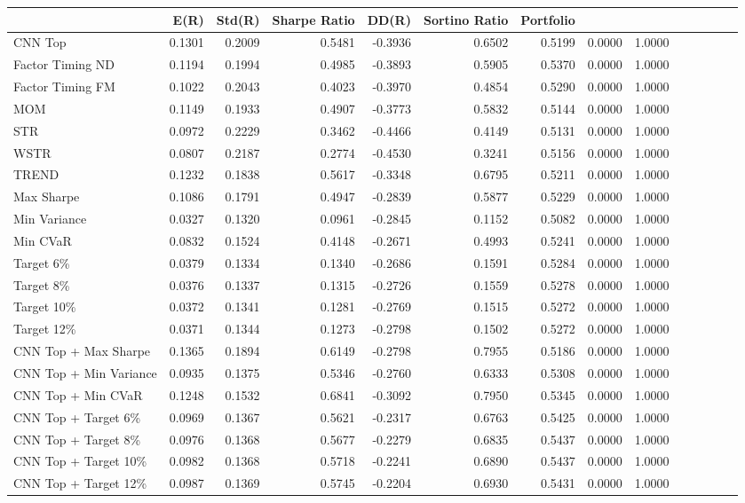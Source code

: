 \begin{tabular}{lrrrrrrrr}
\toprule
 & E(R) & Std(R) & Sharpe Ratio & DD(R) & Sortino Ratio & %
Portfolio &  &  &  &  &  &  &  &  \\
\midrule
CNN Top & 0.1301 & 0.2009 & 0.5481 & -0.3936 & 0.6502 & 0.5199 & 0.0000 & 1.0000 \\
Factor Timing ND & 0.1194 & 0.1994 & 0.4985 & -0.3893 & 0.5905 & 0.5370 & 0.0000 & 1.0000 \\
Factor Timing FM & 0.1022 & 0.2043 & 0.4023 & -0.3970 & 0.4854 & 0.5290 & 0.0000 & 1.0000 \\
MOM & 0.1149 & 0.1933 & 0.4907 & -0.3773 & 0.5832 & 0.5144 & 0.0000 & 1.0000 \\
STR & 0.0972 & 0.2229 & 0.3462 & -0.4466 & 0.4149 & 0.5131 & 0.0000 & 1.0000 \\
WSTR & 0.0807 & 0.2187 & 0.2774 & -0.4530 & 0.3241 & 0.5156 & 0.0000 & 1.0000 \\
TREND & 0.1232 & 0.1838 & 0.5617 & -0.3348 & 0.6795 & 0.5211 & 0.0000 & 1.0000 \\
Max Sharpe & 0.1086 & 0.1791 & 0.4947 & -0.2839 & 0.5877 & 0.5229 & 0.0000 & 1.0000 \\
Min Variance & 0.0327 & 0.1320 & 0.0961 & -0.2845 & 0.1152 & 0.5082 & 0.0000 & 1.0000 \\
Min CVaR & 0.0832 & 0.1524 & 0.4148 & -0.2671 & 0.4993 & 0.5241 & 0.0000 & 1.0000 \\
Target 6\% & 0.0379 & 0.1334 & 0.1340 & -0.2686 & 0.1591 & 0.5284 & 0.0000 & 1.0000 \\
Target 8\% & 0.0376 & 0.1337 & 0.1315 & -0.2726 & 0.1559 & 0.5278 & 0.0000 & 1.0000 \\
Target 10\% & 0.0372 & 0.1341 & 0.1281 & -0.2769 & 0.1515 & 0.5272 & 0.0000 & 1.0000 \\
Target 12\% & 0.0371 & 0.1344 & 0.1273 & -0.2798 & 0.1502 & 0.5272 & 0.0000 & 1.0000 \\
\midrule
CNN Top + Max Sharpe & 0.1365 & 0.1894 & 0.6149 & -0.2798 & 0.7955 & 0.5186 & 0.0000 & 1.0000 \\
CNN Top + Min Variance & 0.0935 & 0.1375 & 0.5346 & -0.2760 & 0.6333 & 0.5308 & 0.0000 & 1.0000 \\
CNN Top + Min CVaR & 0.1248 & 0.1532 & 0.6841 & -0.3092 & 0.7950 & 0.5345 & 0.0000 & 1.0000 \\
CNN Top + Target 6\% & 0.0969 & 0.1367 & 0.5621 & -0.2317 & 0.6763 & 0.5425 & 0.0000 & 1.0000 \\
CNN Top + Target 8\% & 0.0976 & 0.1368 & 0.5677 & -0.2279 & 0.6835 & 0.5437 & 0.0000 & 1.0000 \\
CNN Top + Target 10\% & 0.0982 & 0.1368 & 0.5718 & -0.2241 & 0.6890 & 0.5437 & 0.0000 & 1.0000 \\
CNN Top + Target 12\% & 0.0987 & 0.1369 & 0.5745 & -0.2204 & 0.6930 & 0.5431 & 0.0000 & 1.0000 \\
\bottomrule
\end{tabular}
